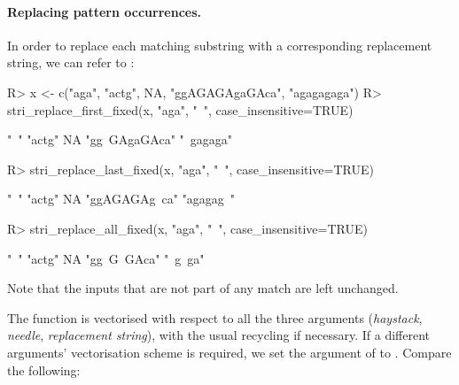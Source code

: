 \documentclass[nojss]{jss}
\begin{document}
\paragraph{Replacing pattern occurrences.}
In order to replace each matching substring with a corresponding
replacement string, we can refer to :

\begin{Schunk}
\begin{Sinput}
R> x <- c("aga", "actg", NA, "ggAGAGAgaGAca", "agagagaga")
R> stri_replace_first_fixed(x, "aga", "~", case_insensitive=TRUE)
\end{Sinput}
\begin{Soutput}
[1] "~"           "actg"        NA            "gg~GAgaGAca" "~gagaga"
\end{Soutput}
\begin{Sinput}
R> stri_replace_last_fixed(x, "aga", "~", case_insensitive=TRUE)
\end{Sinput}
\begin{Soutput}
[1] "~"           "actg"        NA            "ggAGAGAg~ca" "agagag~"
\end{Soutput}
\begin{Sinput}
R> stri_replace_all_fixed(x, "aga", "~", case_insensitive=TRUE)
\end{Sinput}
\begin{Soutput}
[1] "~"         "actg"      NA          "gg~G~GAca" "~g~ga"
\end{Soutput}
\end{Schunk}

Note that the inputs that are not part of any match are left unchanged.

The function is vectorised with respect to all the three arguments
(\textit{haystack}, \textit{needle}, \textit{replacement string}),
with the usual recycling if necessary.
If a different arguments' vectorisation scheme is required,
we set the  argument of 
to .
Compare the following:
\end{document}
